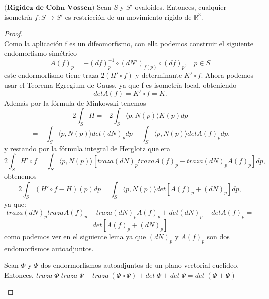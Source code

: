 \begin{teorema} \label{teo:cohn}
	$\textbf{(Rigidez de Cohn-Vossen)}$ Sean $S$ y $S'$ ovaloides. Entonces, cualquier isometría $f : S \to S'$ es restricción de un movimiento rígido de $\mathbb{R}^3$.
\end{teorema}

\begin{proof}
	${ }$\\
	
	Como la aplicación f es un difeomorfismo, con ella podemos construir el siguiente endomorfismo simétrico
	${ }$\\
	\[
		A(f)_p = -(df)^{-1}_{p} \circ (dN')_{f(p)} \circ (df)_p, \;\;\; p \in S
	\]
	${ }$\\
	este endormorfismo tiene traza $2(H' \circ f)$ y determinante $K' \circ f$. Ahora podemos usar el Teorema Egregium de Gauss, ya que f es isometría local, obteniendo
	${ }$\\
	\[
		det A(f) = K' \circ f = K.
	\]
	${ }$\\
	Además por la fórmula de Minkowski tenemos
	${ }$\\
	\[
		2 \int_S H = -2 \int_S \langle p, N(p) \rangle K(p) dp
	\]
	\[
		= - \int_S \langle p, N(p) \rangle det(dN)_p dp - \int_S \langle p, N(p) \rangle det A(f)_p dp.
	\]
	${ }$\\
	y restando por la fórmula integral de Herglotz que era
	${ }$\\
	\[
		2 \int_S H' \circ f = \int_S \langle p, N(p) \rangle [traza(dN)_p trazaA(f)_p - traza(dN)_p A(f)_p] dp,
	\]
	${ }$\\
	obtenemos
	${ }$\\
	\[
		2 \int_S (H' \circ f - H)(p) dp = \int_S \langle p, N(p) \rangle det[A(f)_p + (dN)_p] dp,
	\]
	${ }$\\
	ya que:
	${ }$\\
	$$traza(dN)_p trazaA(f)_p - traza(dN)_p A(f)_p + det(dN)_p + det A(f)_p =$$
	$$ det[A(f)_p + (dN)_p] $$
	${ }$\\
	como podemos ver en el siguiente lema ya que $(dN)_p$ y $A(f)_p$ son dos endomorfismos autoadjuntos.
${ }$\\

	\begin{lema}
		Sean $\Phi$ y $\Psi$ dos endormorfismos autoadjuntos de un plano vectorial euclídeo. Entonces, $traza \; \Phi \; traza \; \Psi - traza \; (\Phi \circ \Psi) + det \; \Phi + det \; \Psi = det \; (\Phi + \Psi)$
	\end{lema}
	

\end{proof}
